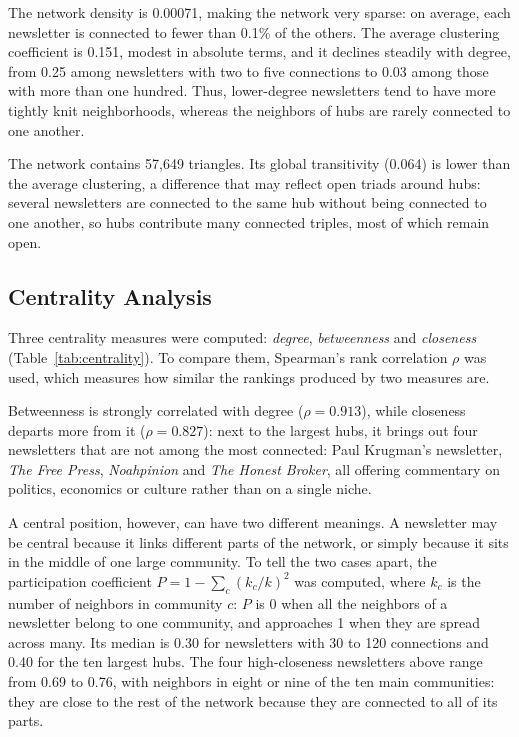 \documentclass[sigchi]{acmart}
\begin{document}
The network density is 0.00071, making the network very sparse: on
average, each newsletter is connected to fewer than 0.1\% of the others.
The average clustering coefficient is 0.151, modest in absolute terms,
and it declines steadily with degree, from 0.25 among newsletters with
two to five connections to 0.03 among those with more than one hundred.
Thus, lower-degree newsletters tend to have more tightly knit
neighborhoods, whereas the neighbors of hubs are rarely connected to
one another.

The network contains 57{,}649 triangles. Its global transitivity (0.064) is lower than the average clustering, a difference that may reflect open triads around hubs: several newsletters are connected to the same hub without being connected to one another, so hubs contribute many connected triples, most of which remain open. 

\subsection{Centrality Analysis}
\label{sec:centrality}

Three centrality measures were computed: \emph{degree},
\emph{betweenness} and \emph{closeness} (Table~\ref{tab:centrality}). To compare them, Spearman's rank correlation $\rho$
was used, which measures how similar the rankings produced by two
measures are. 

Betweenness is strongly correlated with degree ($\rho=0.913$), while closeness departs more from it ($\rho=0.827$): next
to the largest hubs, it brings out four newsletters that are not among the most connected: Paul Krugman's newsletter,
\emph{The Free Press}, \emph{Noahpinion} and \emph{The Honest Broker}, all offering commentary on politics, economics or culture rather than on a single niche.

A central position, however, can have two different meanings. A
newsletter may be central because it links different parts of the
network, or simply because it sits in the middle of one large
community. To tell the two cases apart, the participation coefficient
$P = 1 - \sum_c (k_c/k)^2$ was computed, where $k_c$ is the number of
neighbors in community $c$: $P$ is 0
when all the neighbors of a newsletter belong to one community, and
approaches 1 when they are spread across many. Its median is 0.30 for
newsletters with 30 to 120 connections and 0.40 for the ten largest
hubs. The four high-closeness newsletters above range from 0.69 to
0.76, with neighbors in eight or nine of the ten main communities: they
are close to the rest of the network because they are connected to all
of its parts.
\end{document}

